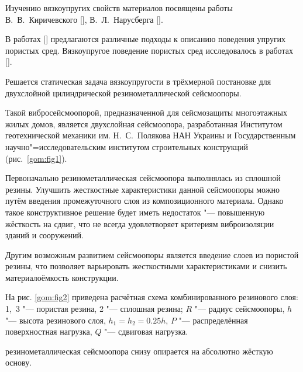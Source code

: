 Изучению вязкоупругих свойств материалов посвящены работы В.~В.~Киричевского [], В.~Л.~Нарусберга []. 

В работах [] предлагаются различные подходы к описанию поведения упругих пористых сред. Вязкоупругое поведение пористых сред исследовалось в работах []. 









\smallskip




Решается статическая задача вязкоупругости в трёхмерной постановке для двухслойной цилиндрической резинометаллической сейсмоопоры. 

Такой вибросейсмоопорой, предназначенной для сейсмозащиты многоэтажных жилых домов, является двухслойная сейсмоопора, разработанная Институтом геотехнической механики им. Н.~С.~Полякова НАН Украины и Государственным научно"=исследовательским институтом строительных конструкций (рис.~\ref{gom:fig1}).



Первоначально резинометаллическая сейсмоопора выполнялась из сплошной резины. Улучшить жесткостные характеристики данной сейсмоопоры можно путём введения промежуточного слоя из композиционного материала. Однако такое конструктивное решение будет иметь недостаток "--- повышенную жёсткость на сдвиг, что не всегда удовлетворяет критериям виброизоляции зданий и сооружений. 

Другим возможным развитием сейсмоопоры является введение слоев из пористой резины, что позволяет варьировать жесткостными характеристиками и снизить материалоёмкость конструкции.



На рис. \ref{gom:fig2} приведена расчётная схема комбинированного резинового слоя: 1,~3 "--- пористая резина, 2 "--- сплошная резина; $R$ "--- радиус сейсмоопоры, $h$ "--- высота резинового слоя, $h_{1}=h_{2}=0.25h$, $P$ "--- распределённая поверхностная нагрузка, $Q$ "--- сдвиговая нагрузка. 

резинометаллическая сейсмоопора снизу опирается на абсолютно жёсткую основу. 

